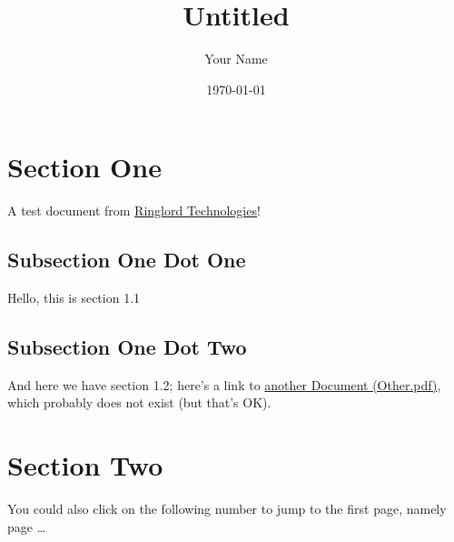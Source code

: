 \documentclass{article}
\title{Untitled}
\author{Your Name}
\date{\today}
\begin{document}
\label{start}

\maketitle

\section{Section One}

A test document from
\href{http://www.Ringlord.com/}{Ringlord Technologies}!

\subsection{Subsection One Dot One}

Hello, this is section 1.1

\subsection{Subsection One Dot Two}

And here we have section 1.2; here's a link to
\href{Other.pdf}{another Document (Other.pdf)},
which probably does not exist (but that's OK).

\section{Section Two}

You could also click on the following number to jump to
the first page, namely page \pageref{start}\ldots



\label{end}
\end{document}
